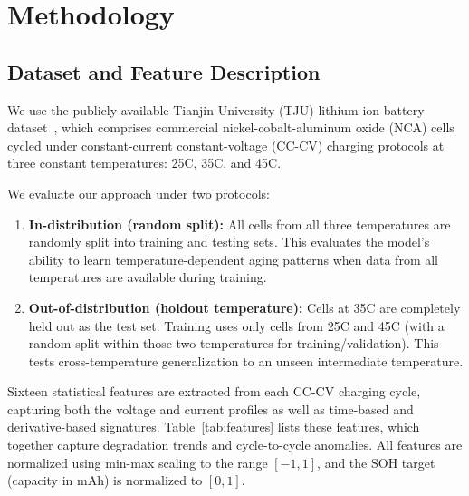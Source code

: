 \documentclass[conference]{IEEEtran}
\begin{document}
\section{Methodology}
\subsection{Dataset and Feature Description}
We use the publicly available Tianjin University (TJU) lithium-ion battery dataset~\cite{zhu2022data}, which comprises commercial nickel-cobalt-aluminum oxide (NCA) cells cycled under constant-current constant-voltage (CC-CV) charging protocols at three constant temperatures: 25\textdegree C, 35\textdegree C, and 45\textdegree C.

We evaluate our approach under two protocols:
\begin{enumerate}
    \item \textbf{In-distribution (random split):} All cells from all three temperatures are randomly split into training and testing sets. This evaluates the model's ability to learn temperature-dependent aging patterns when data from all temperatures are available during training.
    \item \textbf{Out-of-distribution (holdout temperature):} Cells at 35\textdegree C are completely held out as the test set. Training uses only cells from 25\textdegree C and 45\textdegree C (with a random split within those two temperatures for training/validation). This tests cross-temperature generalization to an unseen intermediate temperature.
\end{enumerate}

Sixteen statistical features are extracted from each CC-CV charging cycle, capturing both the voltage and current profiles as well as time-based and derivative-based signatures. Table~\ref{tab:features} lists these features, which together capture degradation trends and cycle-to-cycle anomalies. All features are normalized using min-max scaling to the range \([-1, 1]\), and the SOH target (capacity in mA\textperiodcentered h) is normalized to \([0, 1]\).
\end{document}
